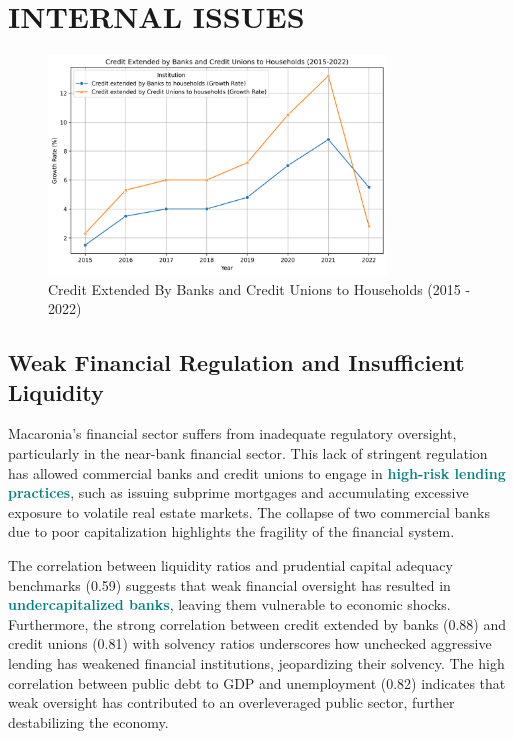 \newpage
\section{INTERNAL ISSUES}




\begin{figure}[h]
     \centering
     \includegraphics[width=0.8\textwidth]{graph_1.png}
     \caption{Credit Extended By Banks and Credit Unions to Households (2015 - 2022)}
     \label{fig:graph_1}
\end{figure}


\subsection*{Weak Financial Regulation and Insufficient Liquidity}

Macaronia's financial sector suffers from inadequate regulatory oversight, particularly in the near-bank financial sector. This lack of stringent regulation has allowed commercial banks and credit unions to engage in \textcolor{teal}{\textbf{high-risk lending practices}}, such as issuing subprime mortgages and accumulating excessive exposure to volatile real estate markets. The collapse of two commercial banks due to poor capitalization highlights the fragility of the financial system.

The correlation between liquidity ratios and prudential capital adequacy benchmarks (0.59) suggests that weak financial oversight has resulted in \textcolor{teal}{\textbf{undercapitalized banks}}, leaving them vulnerable to economic shocks. Furthermore, the strong correlation between credit extended by banks (0.88) and credit unions (0.81) with solvency ratios underscores how unchecked aggressive lending has weakened financial institutions, jeopardizing their solvency. The high correlation between public debt to GDP and unemployment (0.82) indicates that weak oversight has contributed to an overleveraged public sector, further destabilizing the economy.

